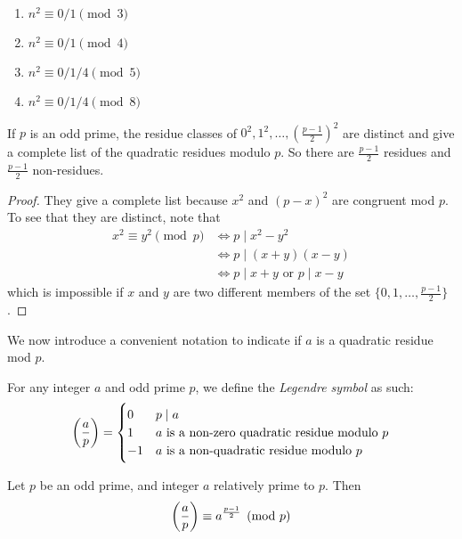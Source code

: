 \begin{proposition} \
\begin{enumerate}[label=(\roman*)]
\item $n^2 \equiv 0/1 \pmod 3$
\item $n^2 \equiv 0/1 \pmod 4$
\item $n^2 \equiv 0/1/4 \pmod 5$
\item $n^2 \equiv 0/1/4 \pmod 8$
\end{enumerate}
\end{proposition}

\begin{proposition}
If $p$ is an odd prime, the residue classes of $0^2,1^2,\dots,(\frac{p-1}{2})^2$ are distinct and give a complete list of the quadratic residues modulo $p$. So there are $\frac{p-1}{2}$ residues and $\frac{p-1}{2}$ non-residues.
\end{proposition}

\begin{proof}
They give a complete list because $x^2$ and $(p-x)^2$ are congruent mod $p$. To see that they are distinct, note that 
\begin{align*}
x^2 \equiv y^2 \pmod p
&\iff p \mid x^2-y^2 \\
&\iff p \mid (x+y)(x-y) \\
&\iff p \mid x+y \text{ or } p \mid x-y
\end{align*}
which is impossible if $x$ and $y$ are two different members of the set $\{0,1,\dots,\frac{p-1}{2}\}$.
\end{proof}

We now introduce a convenient notation to indicate if $a$ is a quadratic residue mod $p$.

\begin{definition}
For any integer $a$ and odd prime $p$, we define the \emph{Legendre symbol} as such:
\[\left(\dfrac{a}{p}\right)=
\begin{cases}
    0 & p \mid a \\
	1 & a\text{ is a non-zero quadratic residue modulo }p\\
	-1 & a\text{ is a non-quadratic residue modulo }p
\end{cases}\]
\end{definition}

\begin{theorem}
Let $p$ be an odd prime, and integer $a$ relatively prime to $p$. Then
\[\left(\dfrac{a}{p}\right)\equiv a^{\frac{p-1}{2}}\pmod p\]
\end{theorem}

